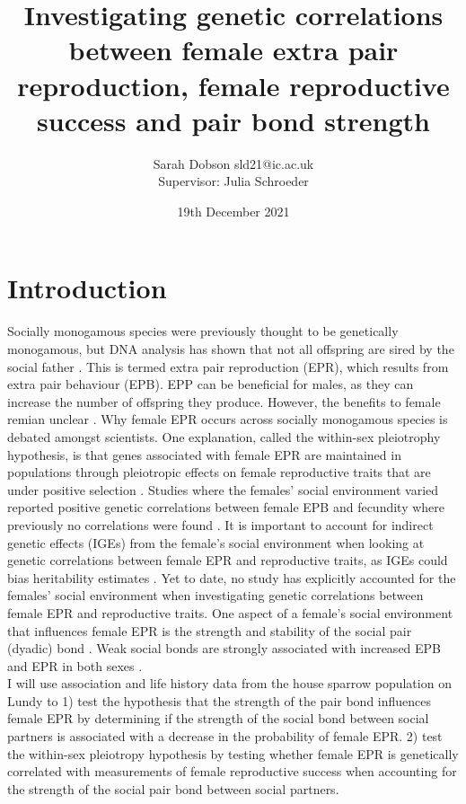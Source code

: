 \documentclass[titlepage]{article}
\title{Investigating genetic correlations between female extra pair reproduction, female reproductive success and pair bond strength}
\author{Sarah Dobson sld21@ic.ac.uk\\[1cm]{\small Supervisor: Julia Schroeder }}
\date{19th December 2021}
\begin{document}
  \maketitle
  \section{Introduction}
  
  Socially monogamous species were previously thought to be genetically monogamous, but DNA analysis has shown that not all offspring are sired by the social father \cite{brouwer2019extra}. This is termed extra pair reproduction (EPR), which results from extra pair behaviour (EPB). EPP can be beneficial for males, as they can increase the number of offspring they produce. However, the benefits to female remian unclear \cite{forstmeier2014female}. Why female EPR occurs across socially monogamous species is debated amongst scientists. One explanation, called the within-sex pleiotrophy hypothesis, is that genes associated with female EPR are maintained in populations through pleiotropic effects on female reproductive traits that are under positive selection \cite{forstmeier2011female}.  Studies where the females’ social environment varied reported positive genetic correlations between female EPB and fecundity where previously no correlations were found \cite{forstmeier2011female, wang2020role}.  It is important to account for indirect genetic effects (IGEs) from the female’s social environment when looking at genetic correlations between female EPR and reproductive traits, as IGEs could bias heritability estimates \cite{radersma2021estimating}. Yet to date, no study has explicitly accounted for the females' social environment when investigating genetic correlations between female EPR and reproductive traits. One aspect of a female’s social environment that influences female EPR is the strength and stability of the social pair (dyadic) bond \cite{maldonado2021relationship}. Weak social bonds are strongly associated with increased EPB and EPR in both sexes \cite{maldonado2018linking, wang2020role}. \\

I will use association and life history data from the house sparrow population on Lundy to 1) test the hypothesis that the strength of the pair bond influences female EPR by determining if the strength of the social bond between social partners is associated with a decrease in the probability of female EPR. 2) test the within-sex pleiotropy hypothesis by testing whether female EPR is genetically correlated with measurements of female reproductive success when accounting for the strength of the social pair bond between social partners.
  
\end{document}
